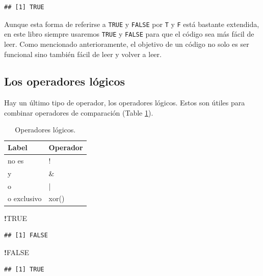 \documentclass[
]{book}
\newenvironment{Shaded}{\begin{snugshade}}{\end{snugshade}}
\newcommand{\OperatorTok}[1]{\textcolor[rgb]{0.81,0.36,0.00}{\textbf{#1}}}
\newcommand{\OtherTok}[1]{\textcolor[rgb]{0.56,0.35,0.01}{#1}}
\begin{document}
\begin{verbatim}
## [1] TRUE
\end{verbatim}

Aunque esta forma de referirse a \texttt{TRUE} y \texttt{FALSE} por \texttt{T} y \texttt{F} está bastante extendida, en este libro siempre usaremos \texttt{TRUE} y \texttt{FALSE} para que el código sea más fácil de leer. Como mencionado anterioramente, el objetivo de un código no solo es ser funcional sino también fácil de leer y volver a leer.

\hypertarget{l011oplog}{%
\subsection{Los operadores lógicos}\label{l011oplog}}

Hay un último tipo de operador, los operadores lógicos. Estos son útiles para combinar operadores de comparación (Table \ref{tab:tabOpLog}).

\begin{table}

\caption{\label{tab:tabOpLog}Operadores lógicos.\label{tab:tabOpLog}}
\centering
\begin{tabular}[t]{l|l}
\hline
Label & Operador\\
\hline
no es & !\\
\hline
y & \&\\
\hline
o & |\\
\hline
o exclusivo & xor()\\
\hline
\end{tabular}
\end{table}

\begin{Shaded}
\begin{Highlighting}[]
\OperatorTok{!}\OtherTok{TRUE}
\end{Highlighting}
\end{Shaded}

\begin{verbatim}
## [1] FALSE
\end{verbatim}

\begin{Shaded}
\begin{Highlighting}[]
\OperatorTok{!}\OtherTok{FALSE}
\end{Highlighting}
\end{Shaded}

\begin{verbatim}
## [1] TRUE
\end{verbatim}
\end{document}
